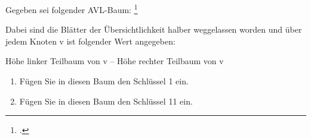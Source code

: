 \documentclass{bschlangaul-aufgabe}
\begin{document}

Gegeben sei folgender AVL-Baum:
\footcite[Seite 3, Aufgabe 5: AVL-Baum]{aud:ab:7}

Dabei sind die Blätter der Übersichtlichkeit halber weggelassen worden
und über jedem Knoten v ist folgender Wert angegeben:

\begin{center}
Höhe linker Teilbaum von v – Höhe rechter Teilbaum von v
\end{center}

\begin{enumerate}


\item Fügen Sie in diesen Baum den Schlüssel 1 ein.


\item Fügen Sie in diesen Baum den Schlüssel 11 ein.

\end{enumerate}
\end{document}
